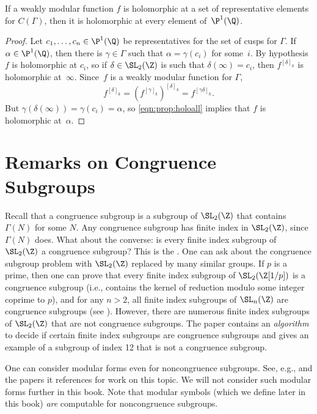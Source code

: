 \begin{proposition}
If a weakly modular function $f$ is holomorphic at a set of
representative elements for $C(\Gamma)$, then it is holomorphic at
every element of~$\P^1(\Q)$.
\end{proposition}
\begin{proof}
Let $c_1,\ldots, c_n \in \P^1(\Q)$ be representatives
for the set of cusps for $\Gamma$.
If $\alpha \in \P^1(\Q)$, then there is $\gamma\in\Gamma$
such that $\alpha = \gamma(c_i)$ for some~$i$.
By hypothesis~$f$ is holomorphic at $c_i$, so if $\delta\in\SL_2(\Z)$
is such that $\delta(\infty) = c_i$, then $f^{[\delta]_k}$
is holomorphic at~$\infty$.  Since~$f$ is a weakly modular
function for $\Gamma$,
\begin{equation}\label{eqn:prop:holoall}
  f^{[\delta]_k} = (f^{[\gamma]_k})^{[\delta]_k} 
   = f^{[\gamma\delta]_k}.
\end{equation}
But $\gamma(\delta(\infty)) = \gamma(c_i) = \alpha$, so 
\eqref{eqn:prop:holoall} implies that $f$ is holomorphic 
at~$\alpha$.
\end{proof}

\section{Remarks on Congruence Subgroups}\label{sec:congsgalg}

Recall that a congruence subgroup is a subgroup of $\SL_2(\Z)$
that contains $\Gamma(N)$ for some $N$.  Any congruence subgroup has
finite index in $\SL_2(\Z)$, since $\Gamma(N)$ does. What about the
converse: is every finite index subgroup of $\SL_2(\Z)$
a congruence subgroup? This is the .  One can ask about the congruence subgroup problem with $\SL_2(\Z)$
replaced by many similar groups.  If $p$ is a prime, then one can
prove that every finite index subgroup of $\SL_2(\Z[1/p])$ is a
congruence subgroup (i.e., contains the kernel of reduction modulo
some integer coprime to $p$), and for any $n>2$, all finite index
subgroups of $\SL_n(\Z)$ are congruence subgroups (see
\cite{humphreys:cong}).  However, there are numerous finite index
subgroups of $\SL_2(\Z)$ that are not congruence subgroups. The paper
\cite{hsu:congsub} contains an {\em algorithm} to decide if certain
finite index subgroups are congruence subgroups and gives an example
of a subgroup of index 12 that is not a congruence subgroup.

One can consider modular forms even for noncongruence subgroups.  See,
e.g., \cite{thompson:noncong} and the papers it references for work on
this topic.  We will not consider such modular forms further in this
book.
Note that modular symbols (which we define later in this book) {\em
  are} computable for noncongruence subgroups.

